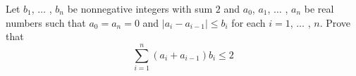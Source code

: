 Let $b_1$, $\dots$ , $b_n$ be nonnegative integers with sum $2$ and $a_0$, $a_1$, $\dots$ , $a_n$ be real numbers such that $a_0=a_n=0$ and $|a_i-a_{i-1}|\leq b_i$ for each $i=1$, $\dots$ , $n$. Prove that
$$\sum_{i=1}^n(a_i+a_{i-1})b_i\leq 2$$